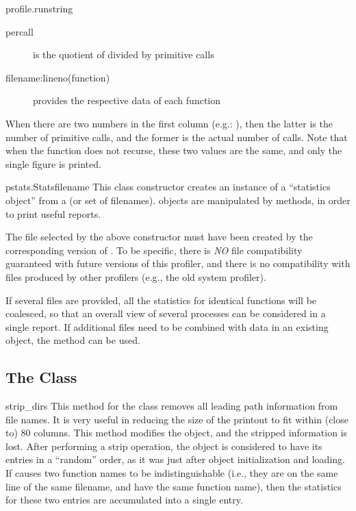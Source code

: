 \begin{funcdesc}{profile.run}{string}
\begin{description}
\item[percall ]
is the quotient of  divided by primitive calls

\item[filename:lineno(function) ]
provides the respective data of each function

\end{description}

When there are two numbers in the first column (e.g.: ),
then the latter is the number of primitive calls, and the former is
the actual number of calls.  Note that when the function does not
recurse, these two values are the same, and only the single figure is
printed.

\end{funcdesc}

\begin{funcdesc}{pstats.Stats}{filename}
This class constructor creates an instance of a ``statistics object''
from a  (or set of filenames).   objects are
manipulated by methods, in order to print useful reports.

The file selected by the above constructor must have been created by
the corresponding version of .  To be specific, there is
\emph{NO} file compatibility guaranteed with future versions of this
profiler, and there is no compatibility with files produced by other
profilers (e.g., the old system profiler).

If several files are provided, all the statistics for identical
functions will be coalesced, so that an overall view of several
processes can be considered in a single report.  If additional files
need to be combined with data in an existing  object, the
 method can be used.
\end{funcdesc}


\subsection{The  Class}

\renewcommand{\indexsubitem}{(Stats method)}

\begin{funcdesc}{strip_dirs}{}
This method for the  class removes all leading path information
from file names.  It is very useful in reducing the size of the
printout to fit within (close to) 80 columns.  This method modifies
the object, and the stripped information is lost.  After performing a
strip operation, the object is considered to have its entries in a
``random'' order, as it was just after object initialization and
loading.  If  causes two function names to be
indistinguishable (i.e., they are on the same line of the same
filename, and have the same function name), then the statistics for
these two entries are accumulated into a single entry.
\end{funcdesc}


